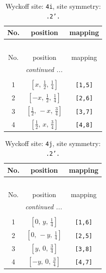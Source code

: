 \documentclass[fleqn,8pt]{jsarticle}
\begin{document}
\renewcommand{\arraystretch}{1.2}
\begin{longtable}{ccc}
\caption{Wyckoff site: {\tt 4i}, site symmetry: {\tt .2'.}}
 \\
 \hline \hline
No. & position & mapping \\ \hline \endfirsthead

\multicolumn{2}{l}{\tablename\ \thetable{}} \\
 \hline \hline
No. & position & mapping \\ \hline \endhead

 \hline \hline
\multicolumn{2}{r}{\footnotesize\it continued ...} \\ \endfoot

 \hline \hline
\multicolumn{2}{r}{} \\ \endlastfoot

1 & $\left[ x,\, \frac{1}{2},\, \frac{1}{4} \right]$ & {\tt [1,5]} \\ \hline
2 & $\left[ - x,\, \frac{1}{2},\, \frac{1}{4} \right]$ & {\tt [2,6]} \\ \hline
3 & $\left[ \frac{1}{2},\, - x,\, \frac{3}{4} \right]$ & {\tt [3,7]} \\ \hline
4 & $\left[ \frac{1}{2},\, x,\, \frac{3}{4} \right]$ & {\tt [4,8]} \\
\end{longtable}
\renewcommand{\arraystretch}{1.2}
\begin{longtable}{ccc}
\caption{Wyckoff site: {\tt 4j}, site symmetry: {\tt .2'.}}
 \\
 \hline \hline
No. & position & mapping \\ \hline \endfirsthead

\multicolumn{2}{l}{\tablename\ \thetable{}} \\
 \hline \hline
No. & position & mapping \\ \hline \endhead

 \hline \hline
\multicolumn{2}{r}{\footnotesize\it continued ...} \\ \endfoot

 \hline \hline
\multicolumn{2}{r}{} \\ \endlastfoot

1 & $\left[ 0,\, y,\, \frac{1}{4} \right]$ & {\tt [1,6]} \\ \hline
2 & $\left[ 0,\, - y,\, \frac{1}{4} \right]$ & {\tt [2,5]} \\ \hline
3 & $\left[ y,\, 0,\, \frac{3}{4} \right]$ & {\tt [3,8]} \\ \hline
4 & $\left[ - y,\, 0,\, \frac{3}{4} \right]$ & {\tt [4,7]} \\
\end{longtable}
\end{document}
